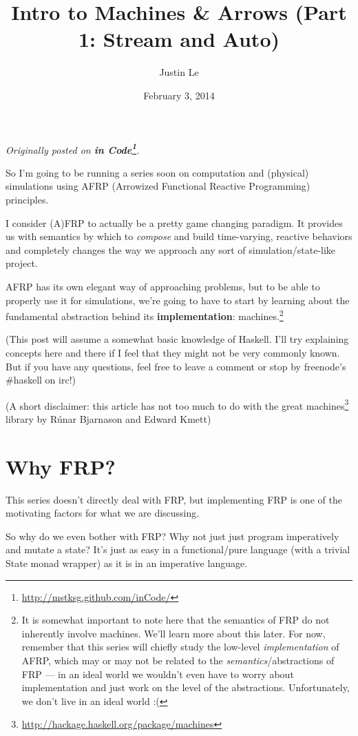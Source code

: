 \documentclass[]{article}
\title{Intro to Machines \& Arrows (Part 1: Stream and Auto)}
\author{Justin Le}
\date{February 3, 2014}
\renewcommand{\href}[2]{#2\footnote{\url{#1}}}
\begin{document}
\maketitle

\emph{Originally posted on
\textbf{\href{http://mstksg.github.com/inCode/}{in Code}}.}

So I'm going to be running a series soon on computation and (physical)
simulations using AFRP (Arrowized Functional Reactive Programming)
principles.

I consider (A)FRP to actually be a pretty game changing paradigm. It
provides us with semantics by which to \emph{compose} and build
time-varying, reactive behaviors and completely changes the way we
approach any sort of simulation/state-like project.

AFRP has its own elegant way of approaching problems, but to be able to
properly use it for simulations, we're going to have to start by
learning about the fundamental abstraction behind its
\textbf{implementation}: machines.\footnote{It is somewhat important to
  note here that the semantics of FRP do not inherently involve
  machines. We'll learn more about this later. For now, remember that
  this series will chiefly study the low-level \emph{implementation} of
  AFRP, which may or may not be related to the
  \emph{semantics}/abstractions of FRP --- in an ideal world we wouldn't
  even have to worry about implementation and just work on the level of
  the abstractions. Unfortunately, we don't live in an ideal world :(}

(This post will assume a somewhat basic knowledge of Haskell. I'll try
explaining concepts here and there if I feel that they might not be very
commonly known. But if you have any questions, feel free to leave a
comment or stop by freenode's \#haskell on irc!)

(A short disclaimer: this article has not too much to do with the great
\href{http://hackage.haskell.org/package/machines}{machines} library by
Rúnar Bjarnason and Edward Kmett)

\section{Why FRP?}\label{why-frp}

This series doesn't directly deal with FRP, but implementing FRP is one
of the motivating factors for what we are discussing.

So why do we even bother with FRP? Why not just just program
imperatively and mutate a state? It's just as easy in a functional/pure
language (with a trivial State monad wrapper) as it is in an imperative
language.
\end{document}
